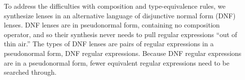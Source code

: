 \documentclass{easychair}
\begin{document}
%    
%

To address the difficulties with composition and type-equivalence rules, we
synthesize lenses in an alternative language of disjunctive normal form (DNF)
lenses. DNF lenses are in pseudonormal form, containing no composition operator,
and so their synthesis never needs to pull regular expressions ``out of thin
air.'' The types of DNF lenses are pairs of regular expressions in a
pseudonormal form, DNF regular expressions. Because DNF regular expressions are
in a pseudonormal form, fewer equivalent regular expressions need to be searched
through.
\end{document}
